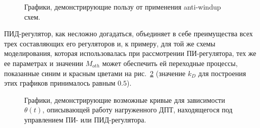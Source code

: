 \documentclass[12pt,a4paper,openany]{extarticle}
\begin{document}
\begin{figure}[h!]
	\vspace{-1cm}
	\caption{Графики, демонстрирующие пользу от применения anti-windup схем.}
	\label{fig:PI_regul_with_anti_windup}
\end{figure}	

ПИД-регулятор, как несложно догадаться, объединяет в себе преимущества всех трех составляющих его регуляторов и, к примеру, для той же схемы моделирования, которая использовалась при рассмотрении ПИ-регулятора, тех же ее параметрах и значении $M_{oth}$ может обеспечить ей переходные процессы, показанные синим и красным цветами на рис.~\ref{fig:PID_graphs_final} (значение $k_D$ для построения этих графиков принималось равным $0.5$).

\begin{figure}[h!]
	\vspace{-1cm}
	\caption{Графики, демонстрирующие возможные кривые для зависимости $\theta(t)$, описывающей работу нагруженного ДПТ, находящегося под управлением ПИ- или ПИД-регулятора.}
	\label{fig:PID_graphs_final}
\end{figure}	
\end{document}
